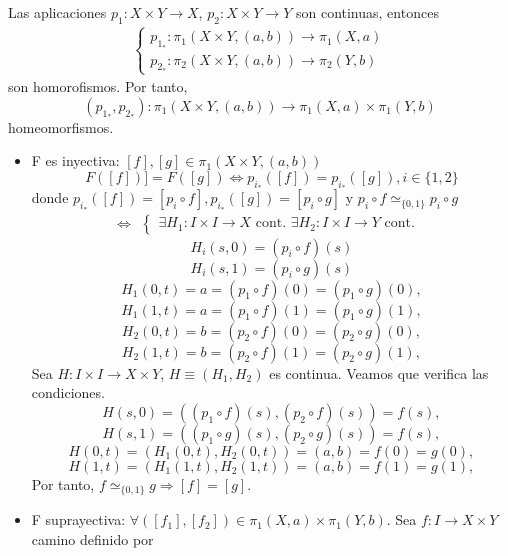 \begin{dem}
  Las aplicaciones $p_{1} : X \times Y \to X$, $p_{2} : X \times Y \to Y$ son continuas, entonces
  \[ 
    \begin{aligned}
      \begin{cases}
        p_{1}_* : \pi_{1}(X \times Y, (a, b)) \to \pi_{1}(X, a) \\
        p_{2}_* : \pi_{2}(X \times Y, (a, b)) \to \pi_{2}(Y, b)
      \end{cases}
    \end{aligned} 
  \] 
  son homorofismos. Por tanto,
  \[ 
    (p_{1}_*, p_{2}_*) : \pi_{1}(X \times Y, (a, b)) \to \pi_{1}(X, a) \times \pi_{1}(Y, b) 
  \] 
  homeomorfismos.
  \begin{itemize}
    \item F es inyectiva: $[f], [g] \in \pi_{1}(X \times Y, (a, b))$
      \[ 
        F([f])] = F([g]) \Leftrightarrow p_{i}_*([f]) = p_{i}_*([g]), i \in \{ 1, 2 \}
      \] 
      donde $p_{i}_*([f]) = [p_{i} \circ f],  p_{i}_*([g]) = [p_{i} \circ g]$ y $p_{i} \circ f \simeq_{\{ 0, 1 \}} p_{i} \circ g$
      \[ 
        \Leftrightarrow
        \begin{aligned}
          \begin{cases}
            \exists H_{1} : I \times I \to X \text{ cont. }
            \exists H_{2} : I \times I \to Y \text{ cont. }
          \end{cases}
        \end{aligned} 
      \] 
      \[ 
        H_{i}(s, 0) = (p_{i} \circ f)(s) 
      \] 
      \[ 
        H_{i}(s, 1) = (p_{i} \circ g)(s) 
      \] 
      \[ 
        H_{1}(0, t) = a = (p_{1} \circ f)(0) = (p_{1} \circ g)(0), 
      \] 
      \[ 
        H_{1}(1, t) = a = (p_{1} \circ f)(1) = (p_{1} \circ g)(1),
      \] 
      \[ 
        H_{2}(0, t) = b = (p_{2} \circ f)(0) = (p_{2} \circ g)(0),
      \] 
      \[ 
        H_{2}(1, t) = b = (p_{2} \circ f)(1) = (p_{2} \circ g)(1),
      \] 
      Sea $H : I \times I \to X \times Y$, $H \equiv (H_{1}, H_{2})$ es continua. Veamos que verifica las condiciones.
      \[ 
        H(s, 0) = ((p_{1} \circ f)(s), (p_{2} \circ f)(s)) = f(s),
      \] 
      \[ 
        H(s, 1) = ((p_{1} \circ g)(s), (p_{2} \circ g)(s)) = f(s),
      \] 
      \[ 
        H(0,t) = (H_{1}(0, t), H_{2}(0, t)) = (a, b) = f(0) = g(0),
      \] 
      \[ 
        H(1, t) = (H_{1}(1, t), H_{2}(1, t)) = (a, b) = f(1) = g(1),
      \] 
      Por tanto, $f \simeq_{\{ 0, 1 \}} g \Rightarrow [f] = [g]$.
    \item F suprayectiva: $\forall ([f_{1}], [f_{2}]) \in \pi_{1}(X, a) \times \pi_{1}(Y, b)$. Sea $f : I \to X \times Y$ camino definido por

\end{itemize}
\end{dem}
